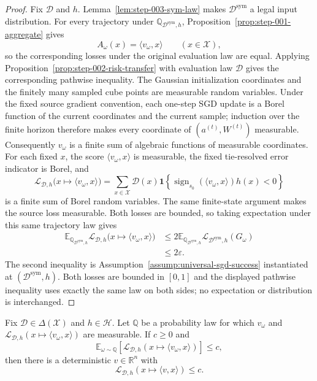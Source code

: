 \begin{proof}
Fix $\mathcal D$ and $h$.  Lemma~\ref{lem:step-003-sym-law} makes
$\mathcal D^{\mathrm{sym}}$ a legal input distribution.  For every trajectory
under $\mathbb Q_{\mathcal D^{\mathrm{sym}},h}$,
Proposition~\ref{prop:step-001-aggregate} gives
\[
A_\omega(x)=\langle v_\omega,x\rangle\qquad(x\in\mathcal X),
\]
so the corresponding losses under the original evaluation law are equal.
  Applying Proposition~\ref{prop:step-002-risk-transfer} with evaluation law
  $\mathcal D$ gives the corresponding pathwise inequality.  The Gaussian
  initialization coordinates and the finitely many sampled cube points are
  measurable random variables.  Under the fixed source gradient convention,
  each one-step SGD update is a Borel function of the current coordinates and
  the current sample; induction over the finite horizon therefore makes every
  coordinate of $(a^{(t)},W^{(t)})$ measurable.  Consequently $v_\omega$ is a
  finite sum of algebraic functions of measurable coordinates.  For each
  fixed $x$, the score $\langle v_\omega,x\rangle$ is measurable, the fixed
  tie-resolved error indicator is Borel, and
  \[
  \mathcal L_{\mathcal D,h}
   \bigl(x\mapsto\langle v_\omega,x\rangle\bigr)
  =\sum_{x\in\mathcal X}\mathcal D(x)
   \mathbf 1\!\left\{
    \operatorname{sign}_{s_0}(\langle v_\omega,x\rangle)h(x)<0
   \right\}
  \]
  is a finite sum of Borel random variables.  The same finite-state argument
  makes the source loss measurable.  Both losses are bounded, so taking
  expectation under this same trajectory law gives
\[
\begin{aligned}
\mathbb E_{\mathbb Q_{\mathcal D^{\mathrm{sym}},h}}
 \mathcal L_{\mathcal D,h}\bigl(x\mapsto\langle v_\omega,x\rangle\bigr)
&\leq 2\mathbb E_{\mathbb Q_{\mathcal D^{\mathrm{sym}},h}}
 \mathcal L_{\mathcal D^{\mathrm{sym}},h}(G_\omega)\\
&\leq2\varepsilon.
\end{aligned}
\]
The second inequality is Assumption~\ref{assump:universal-sgd-success}
instantiated at $(\mathcal D^{\mathrm{sym}},h)$.  Both losses are bounded in
$[0,1]$ and the displayed pathwise inequality uses exactly the same law on
both sides; no expectation or distribution is interchanged.
\end{proof}

\begin{lemma}
\label{lem:step-003-finite-extraction}
Fix $\mathcal D\in\Delta(\mathcal X)$ and $h\in\mathcal H$.  Let
$\mathbb Q$ be a probability law for which $v_\omega$ and
$\mathcal L_{\mathcal D,h}(x\mapsto\langle v_\omega,x\rangle)$ are
measurable.  If $c\geq0$ and
\[
\mathbb E_{\omega\sim\mathbb Q}
 \left[\mathcal L_{\mathcal D,h}(x\mapsto\langle v_\omega,x\rangle)\right]
\leq c,
\]
then there is a deterministic $v\in\mathbb R^n$ with
\[
\mathcal L_{\mathcal D,h}(x\mapsto\langle v,x\rangle)\leq c.
\]
\end{lemma}

